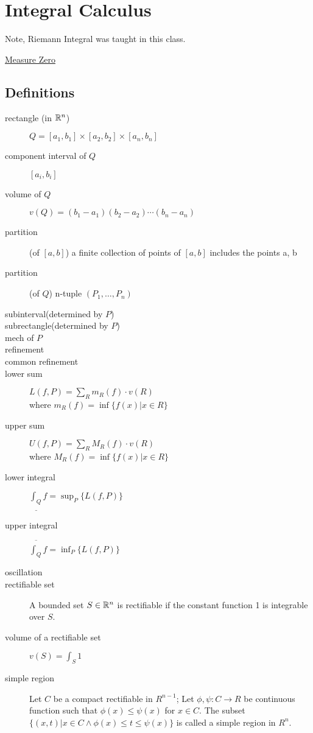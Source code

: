 \section{Integral Calculus}
Note, Riemann Integral was taught in this class.

\hyperref[measure_zero]{Measure Zero}


\subsection{Definitions}
\begin{description}
\item[rectangle (in ${\mathbb R}^n$)] $Q = [a_1,b_1]\times[a_2,b_2]\times[a_n,b_n]$
\item[component interval of $Q$] $[a_i,b_i]$
\item[volume of $Q$] $v(Q) = (b_1-a_1)(b_2-a_2)\cdots(b_n-a_n)$
\item[partition] (of $[a, b]$) a finite collection of points of $[a,b]$ includes the points a, b
\item[partition] (of $Q$) n-tuple $(P_1, \ldots, P_n)$
\item[subinterval(determined by $P$)] \OMIT
\item[subrectangle(determined by $P$)] \OMIT
\item[mech of $P$] \OMIT
\item[refinement] \OMIT
\item[common refinement] \OMIT
\item[lower sum] $L(f, P)=\sum_R m_R(f)\cdot v(R)$\hfill\\
	where $m_R(f)=\inf\{f(x)|x\in R\}$
\item[upper sum] $U(f, P)=\sum_R M_R(f)\cdot v(R)$\hfill\\
	where $M_R(f)=\inf\{f(x)|x\in R\}$
\item[lower integral] $\underline{\int_Q}f=\sup_P\{L(f,P)\}$
\item[upper integral] $\overline{\int_Q}f=\inf_P\{L(f,P)\}$
\item[oscillation] \TODO
\item[rectifiable set] A bounded set $S\in{\mathbb R}^n$ is rectifiable if the constant function 1 is integrable over $S$.
\item[volume of a rectifiable set] $v(S)=\int_S 1$
\item[simple region] Let $C$ be a compact rectifiable in $R^{n-1}$;
	Let $\phi, \psi:C\to R$ be continuous function such that $\phi(x) \leq \psi(x)$ for $x\in C$.
	The subset $\{(x, t)|x\in C\wedge \phi(x) \leq t \leq \psi(x)\}$ is called a simple region in $R^n$.
\end{description}


